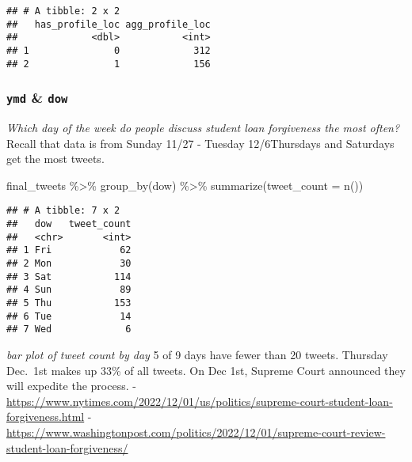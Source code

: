 \documentclass[
]{article}
\newenvironment{Shaded}{\begin{snugshade}}{\end{snugshade}}
\newcommand{\AttributeTok}[1]{\textcolor[rgb]{0.77,0.63,0.00}{#1}}
\newcommand{\FunctionTok}[1]{\textcolor[rgb]{0.00,0.00,0.00}{#1}}
\newcommand{\NormalTok}[1]{#1}
\newcommand{\OtherTok}[1]{\textcolor[rgb]{0.56,0.35,0.01}{#1}}
\newcommand{\SpecialCharTok}[1]{\textcolor[rgb]{0.00,0.00,0.00}{#1}}
\begin{document}
\begin{verbatim}
## # A tibble: 2 x 2
##   has_profile_loc agg_profile_loc
##             <dbl>           <int>
## 1               0             312
## 2               1             156
\end{verbatim}

\hypertarget{ymd-dow}{%
\subsubsection{\texorpdfstring{\texttt{ymd} \&
\texttt{dow}}{ymd \& dow}}\label{ymd-dow}}

\emph{Which day of the week do people discuss student loan forgiveness
the most often?} Recall that data is from Sunday 11/27 - Tuesday
12/6Thursdays and Saturdays get the most tweets.

\begin{Shaded}
\begin{Highlighting}[]
\NormalTok{final\_tweets }\SpecialCharTok{\%\textgreater{}\%} \FunctionTok{group\_by}\NormalTok{(dow) }\SpecialCharTok{\%\textgreater{}\%} \FunctionTok{summarize}\NormalTok{(}\AttributeTok{tweet\_count =} \FunctionTok{n}\NormalTok{())}
\end{Highlighting}
\end{Shaded}

\begin{verbatim}
## # A tibble: 7 x 2
##   dow   tweet_count
##   <chr>       <int>
## 1 Fri            62
## 2 Mon            30
## 3 Sat           114
## 4 Sun            89
## 5 Thu           153
## 6 Tue            14
## 7 Wed             6
\end{verbatim}

\emph{bar plot of tweet count by day} 5 of 9 days have fewer than 20
tweets. Thursday Dec.~1st makes up 33\% of all tweets. On Dec 1st,
Supreme Court announced they will expedite the process. -
\url{https://www.nytimes.com/2022/12/01/us/politics/supreme-court-student-loan-forgiveness.html}
-
\url{https://www.washingtonpost.com/politics/2022/12/01/supreme-court-review-student-loan-forgiveness/}

\begin{Shaded}
\end{Shaded}
\end{document}
